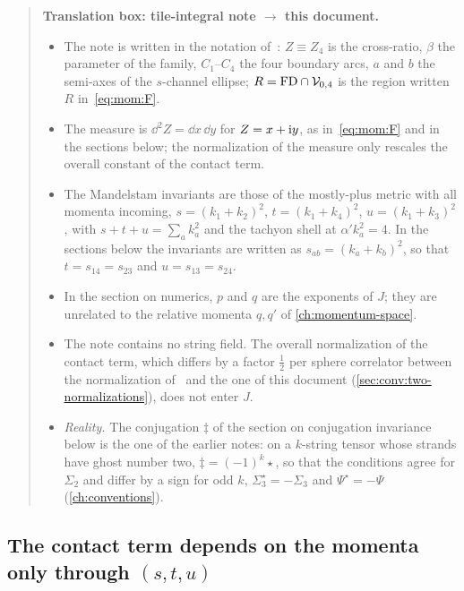 \begin{quote}
  \small
  \textbf{Translation box: tile-integral note $\to$ this document.}
  \begin{itemize}
    \setlength{\itemsep}{0.3ex}
    \item The note is written in the notation of~\cite{Erbin:2023:SL2CQuarticVertex}: $Z \equiv Z_4$ is the cross-ratio, $\beta$ the parameter of the family, $C_1$--$C_4$ the four boundary arcs, $a$ and $b$ the semi-axes of the $s$-channel ellipse; $R = \mathrm{FD} \cap {\mathcal{V}}_{0,4}$ is the region written $R$ in~\eqref{eq:mom:F}.
    \item The measure is $\dd^2 Z = \dd x \, \dd y$ for $Z = x + \mathrm{i} y$, as in~\eqref{eq:mom:F} and in the sections below; the normalization of the measure only rescales the overall constant of the contact term.
    \item The Mandelstam invariants are those of the mostly-plus metric with all momenta incoming, $s = (k_1 + k_2)^2$, $t = (k_1 + k_4)^2$, $u = (k_1 + k_3)^2$, with $s + t + u = \sum_a k_a^2$ and the tachyon shell at $\alpha' k_a^2 = 4$.
      In the sections below the invariants are written as $s_{ab} = (k_a + k_b)^2$, so that $t = s_{14} = s_{23}$ and $u = s_{13} = s_{24}$.
    \item In the section on numerics, $p$ and $q$ are the exponents of $J$; they are unrelated to the relative momenta $q, q'$ of \cref{ch:momentum-space}.
    \item The note contains no string field. The overall normalization of the contact term, which differs by a factor $\frac{1}{2}$ per sphere correlator between the normalization of~\cite{Erbin:2023:SL2CQuarticVertex} and the one of this document (\cref{sec:conv:two-normalizations}), does not enter $J$.
    \item \emph{Reality.} The conjugation $\ddagger$ of the section on conjugation invariance below is the one of the earlier notes: on a $k$-string tensor whose strands have ghost number two, $\ddagger = (-1)^k \star$, so that the conditions agree for $\Sigma_2$ and differ by a sign for odd $k$, $\Sigma_3^\star = - \Sigma_3$ and $\Psi^\star = - \Psi$ (\cref{ch:conventions}).
  \end{itemize}
\end{quote}



\subsection{The contact term depends on the momenta only through \texorpdfstring{$(s, t, u)$}{(s, t, u)}}
\label{sec:sl2c:stu}

